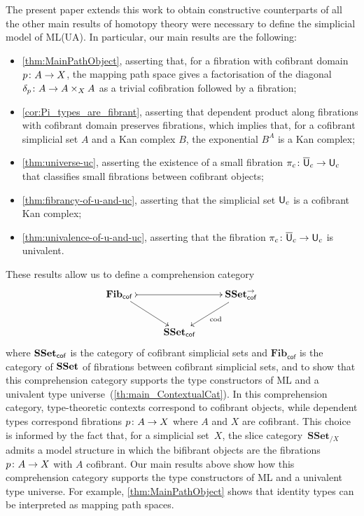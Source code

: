 \documentclass[reqno,10pt,a4paper,oneside,draft]{amsart}
\begin{document}
 The present paper extends this work to obtain constructive counterparts of all the other main results of 
homotopy theory were necessary to define the simplicial model of ML(UA). In particular, our main results are the following:
\begin{itemize}
\item \cref{thm:MainPathObject}, asserting that, for a fibration with cofibrant domain $p \colon A \to X$, the mapping path space 
gives a factorisation of the diagonal $\delta_p \colon A \to A \times_X A$ as a trivial cofibration followed by a fibration;
\item \cref{cor:Pi_types_are_fibrant}, asserting that dependent product along fibrations with cofibrant
domain preserves fibrations, which implies that, for a cofibrant simplicial set $A$ and a Kan complex $B$, the exponential $B^A$ is a Kan complex; 
\item \cref{thm:universe-uc}, asserting the existence of a small fibration $\pi_c \colon
\overline{\mathsf{U}}_c \to \mathsf{U}_c$ that classifies small fibrations between cofibrant objects;
\item \cref{thm:fibrancy-of-u-and-uc}, asserting that the simplicial set $\mathsf{U}_c$ is a cofibrant Kan complex;
\item \cref{thm:univalence-of-u-and-uc}, asserting that the fibration $\pi_c  \colon
\overline{\mathsf{U}}_c \to \mathsf{U}_c$ is univalent.
\end{itemize}





These results allow us to define a comprehension category 
\begin{equation*}
\begin{gathered}
\xymatrix{
\mathbf{Fib}_{ \mathsf{cof}} \, \ar[dr] \ar@{>->}[rr] & & \SSet^{\to}_{\mathsf{cof}} \ar[dl]^{\mathrm{cod}} \\ 
 & \SSet_{\mathsf{cof}} &  }
 \end{gathered}
 \end{equation*}
 where $\mathbf{SSet}_{\mathsf{cof}}$ is the category of cofibrant simplicial sets and  $\mathbf{Fib}_{ \mathsf{cof}}$ is the category of $\mathbf{SSet}$ of fibrations between cofibrant simplicial
 sets, and to show that this comprehension category supports the type constructors of ML and a univalent type universe~(\cref{th:main_ContextualCat}). In this 
comprehension category, type-theoretic
contexts correspond to cofibrant objects, while dependent types correspond fibrations $p \colon A \to X$ where 
 $A$ and $X$ are cofibrant. This choice is informed by the fact that, for a simplicial set~$X$, the slice category~$\mathbf{SSet}_{/X}$ admits a model structure in which the bifibrant objects are
 the fibrations $p \colon A \to X$ with $A$ cofibrant. Our main results above show how this comprehension category  supports the type constructors of ML and a univalent type universe.
For example, \cref{thm:MainPathObject} shows that identity types can be interpreted as 
mapping path spaces. 
\end{document}
